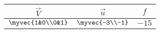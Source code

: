 \begin{tabular}{|c|c|c|}
\hline
         $\vec{V}$ & $\vec{u}$ & $f$ \\
         \hline
         $\myvec{1&0\\0&1} $ & $\myvec{-3\\-1}$ & $-15$ \\
         \hline
    \end{tabular}
